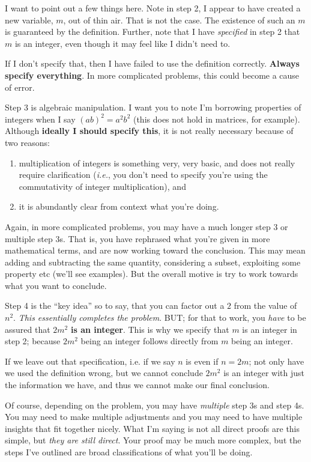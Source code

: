 I want to point out a few things here. Note in step 2, I appear to have created a new variable, $m$, out of thin air. That is not the case. The existence of such an $m$ is guaranteed by the definition. Further, note that I have \textit{specified} in step 2 that $m$ is an integer, even though it may feel like I didn't need to.

If I don't specify that, then I have failed to use the definition correctly. \textbf{Always specify everything}. In more complicated problems, this could become a cause of error.

Step 3 is algebraic manipulation. I want you to note I'm borrowing properties of integers when I say $(ab)^2 = a^2b^2$ (this does not hold in matrices, for example). Although \textbf{ideally I should specify this}, it is not really necessary because of two reasons:
\begin{enumerate}
  \item multiplication of integers is something very, very basic, and does not really require clarification (\textit{i.e.}, you don't need to specify you're using the commutativity of integer multiplication), and
  \item it is abundantly clear from context what you're doing.
\end{enumerate}

Again, in more complicated problems, you may have a much longer step 3 or multiple step 3s. That is, you have rephrased what you're given in more mathematical terms, and are now working toward the conclusion. This may mean adding and subtracting the same quantity, considering a subset, exploiting some property etc (we'll see examples). But the overall motive is try to work towards what you want to conclude.

Step 4 is the ``key idea'' so to say, that you can factor out a $2$ from the value of $n^2$. \textit{This essentially completes the problem}. BUT; for that to work, you \textit{have} to be assured that $2m^2$ \textbf{is an integer}. This is why we specify that $m$ is an integer in step 2; because $2m^2$ being an integer follows directly from $m$ being an integer.

If we leave out that specification, i.e. if we say $n$ is even if $n = 2m$; not only have we used the definition wrong, but we cannot conclude $2m^2$ is an integer with just the information we have, and thus we cannot make our final conclusion.

Of course, depending on the problem, you may have \textit{multiple} step 3s and step 4s. You may need to make multiple adjustments and you may need to have multiple insights that fit together nicely. What I'm saying is not all direct proofs are this simple, but \textit{they are still direct}. Your proof may be much more complex, but the steps I've outlined are broad classifications of what you'll be doing.

